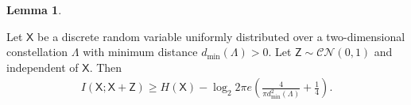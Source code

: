 \documentclass[12pt, draftclsnofoot, onecolumn]{IEEEtran}
\newcommand{\msf}[1]{\mathsf{#1}}
\theoremstyle{definition}
\newtheorem{lemma}{Lemma}
\begin{document}
\begin{lemma}\label{lma:gap_lattice}


%

Let $\msf{X}$ be a discrete random variable uniformly distributed over a two-dimensional constellation $\Lambda$ with minimum distance $d_{\min}(\Lambda)>0$. Let $\msf{Z}\sim \mathcal{CN}(0,1)$ and independent of $\msf{X}$. Then
    \begin{align}\label{eq:th1}
        I(\msf{X};\msf{X}+\msf{Z}) \geq H(\msf{X}) - \log_2 2\pi e \left(\frac{4}{\pi d^2_{\min}(\Lambda)} + \frac{1}{4}\right).
    \end{align}
\end{lemma}
\end{document}
